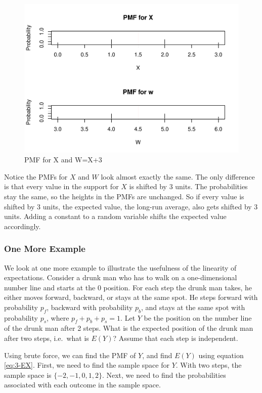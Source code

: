\documentclass[
]{book}
\begin{document}
\begin{figure}
\centering
\includegraphics{bookdown-demo_files/figure-latex/3-pmf-lin2-1.pdf}
\caption{\label{fig:3-pmf-lin2}PMF for X and W=X+3}
\end{figure}

Notice the PMFs for \(X\) and \(W\) look almost exactly the same. The only difference is that every value in the support for \(X\) is shifted by 3 units. The probabilities stay the same, so the heights in the PMFs are unchanged. So if every value is shifted by 3 units, the expected value, the long-run average, also gets shifted by 3 units. Adding a constant to a random variable shifts the expected value accordingly.

\hypertarget{one-more-example}{%
\subsubsection{One More Example}\label{one-more-example}}

We look at one more example to illustrate the usefulness of the linearity of expectations. Consider a drunk man who has to walk on a one-dimensional number line and starts at the 0 position. For each step the drunk man takes, he either moves forward, backward, or stays at the same spot. He steps forward with probability \(p_f\), backward with probability \(p_b\), and stays at the same spot with probability \(p_s\), where \(p_f + p_b+p_s = 1\). Let \(Y\) be the position on the number line of the drunk man after 2 steps. What is the expected position of the drunk man after two steps, i.e.~what is \(E(Y)\)? Assume that each step is independent.

Using brute force, we can find the PMF of \(Y\), and find \(E(Y)\) using equation \eqref{eq:3-EX}. First, we need to find the sample space for \(Y\). With two steps, the sample space is \(\{-2,-1,0,1,2\}\). Next, we need to find the probabilities associated with each outcome in the sample space.
\end{document}
